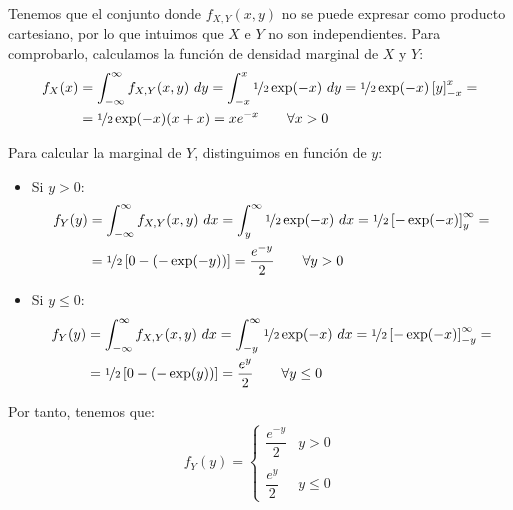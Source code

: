 \begin{ejercicio}
\begin{figure}[H]
    \end{figure}

    Tenemos que el conjunto donde $f_{X,Y}(x,y)$ no se puede expresar como producto cartesiano, por lo que intuimos que $X$ e $Y$ no son independientes. Para comprobarlo, calculamos la función de densidad marginal de $X$ y $Y$:
    \begin{align*}
        f_X(x) &= \int_{-\infty}^{\infty} f_{X,Y}(x, y) \ dy
        = \int_{-x}^{x} \nicefrac{1}{2}\exp(-x) \ dy
        = \nicefrac{1}{2}\exp(-x)\left[y\right]_{-x}^{x}
        =\\&= \nicefrac{1}{2}\exp(-x)(x+x) = xe^{-x} \qquad \forall x>0
    \end{align*}

    Para calcular la marginal de $Y$, distinguimos en función de $y$:
    \begin{itemize}
        \item Si $y>0$:
        \begin{align*}
            f_Y(y) &= \int_{-\infty}^{\infty} f_{X,Y}(x, y) \ dx
            = \int_{y}^{\infty} \nicefrac{1}{2}\exp(-x) \ dx
            = \nicefrac{1}{2}\left[-\exp(-x)\right]_{y}^{\infty}
            =\\&= \nicefrac{1}{2}\left[0 - (-\exp(-y))\right]
            = \frac{e^{-y}}{2} \qquad \forall y>0
        \end{align*}

        \item Si $y\leq 0$:
        \begin{align*}
            f_Y(y) &= \int_{-\infty}^{\infty} f_{X,Y}(x, y) \ dx
            = \int_{-y}^{\infty} \nicefrac{1}{2}\exp(-x) \ dx
            = \nicefrac{1}{2}\left[-\exp(-x)\right]_{-y}^{\infty}
            =\\&= \nicefrac{1}{2}\left[0 - (-\exp(y))\right]
            = \frac{e^{y}}{2} \qquad \forall y\leq 0
        \end{align*}
    \end{itemize}

    Por tanto, tenemos que:
    \begin{align*}
        f_Y(y)=\begin{cases}
            \dfrac{e^{-y}}{2} & y>0\\ \\
            \dfrac{e^{y}}{2} & y\leq 0
        \end{cases}
    \end{align*}


\end{ejercicio}
